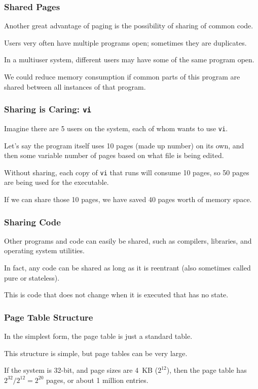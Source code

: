 \begin{frame}
\frametitle{Shared Pages}

Another great advantage of paging is the possibility of sharing of common code. 

Users very often have multiple programs open; sometimes they are duplicates.

In a multiuser system, different users may have some of the same program open.

We could reduce memory consumption if common parts of this program are shared between all instances of that program.

\end{frame}


\begin{frame}
\frametitle{Sharing is Caring: \texttt{vi}}

Imagine there are 5 users on the system, each of whom wants to use \texttt{vi}. 

Let's say the program itself uses 10 pages (made up number) on its own, and then some variable number of pages based on what file is being edited. 

Without sharing, each copy of \texttt{vi} that runs will consume 10 pages, so 50 pages are being used for the executable. 

If we can share those 10 pages, we have saved 40 pages worth of memory space.


\end{frame}

\begin{frame}
\frametitle{Sharing Code}

Other programs and code can easily be shared, such as compilers, libraries, and operating system utilities. 

In fact, any code can be shared as long as it is reentrant (also sometimes called pure or stateless). 

This is code that does not change when it is executed that has no state.


\end{frame}

\begin{frame}
\frametitle{Page Table Structure}

In the simplest form, the page table is just a standard table. 

This structure is simple, but page tables can be very large.

If the system is 32-bit, and page sizes are 4~KB ($2^{12}$), then the page table has $2^{32}/2^{12} = 2^{20}$ pages, or about 1 million entries.

\end{frame}

